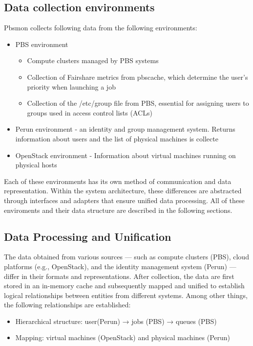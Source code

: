 \documentclass[
  digital,     %
  oneside,     %
  nosansbold,  %
  nocolorbold, %
  lof,         %
  lot,         %
]{fithesis4}
\begin{document}
\subsection{Data collection environments}
\label{subsec:data-collection-environments}
Pbsmon collects following data from the following environments:
\begin{itemize}
  \item PBS environment
  \begin{itemize}
    \item Compute clusters managed by PBS systems
    \item Collection of Fairshare metrics from pbscache, which determine the user's priority when launching a job
    \item Collection of the /etc/group file from PBS, essential for assigning users to groups used in access control lists (ACLs)
  \end{itemize}
  \item Perun environment - an identity and group management system. Returns information about users and the list of physical machines is collecte
  \item OpenStack environment - Information about virtual machines running on physical hosts
\end{itemize}

Each of these environments has its own method of communication and data representation. Within the system architecture, these differences are abstracted through interfaces and adapters that ensure unified data processing. All of these enviroments and their data structure are described in the following sections.

\subsection{Data Processing and Unification}
\label{subsec:data-processing-and-unification}

The data obtained from various sources — such as compute clusters (PBS), cloud platforms (e.g., OpenStack), and the identity management system (Perun) — differ in their formats and representations. After collection, the data are first stored in an in-memory cache and subsequently mapped and unified to establish logical relationships between entities from different systems. Among other things, the following relationships are established:

\begin{itemize}
  \item Hierarchical structure: user(Perun) → jobs (PBS) → queues (PBS)
  \item Mapping: virtual machines (OpenStack) and physical machines (Perun)
\end{itemize}
\end{document}
